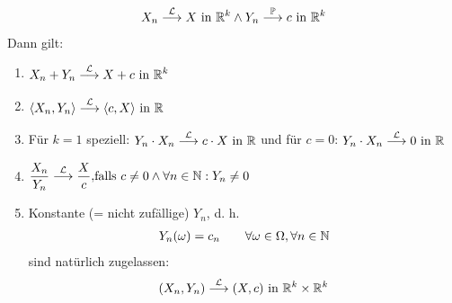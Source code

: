\begin{beispiel}\label{beisp4.18}
	\begin{align*}
		X_n\stackrel{\mathcal{L}}{\longrightarrow} X\text{ in }\mathbb{R}^k\wedge Y_n\stackrel{\mathbb{P}}{\longrightarrow} c\text{ in }\mathbb{R}^k
	\end{align*}
	Dann gilt:
	\begin{enumerate}[label=(\arabic*)]
		\item $\begin{aligned}
			X_n+Y_n\stackrel{\mathcal{L}}{\longrightarrow} X+c\text{ in }\mathbb{R}^k
		\end{aligned}$
		\item $\begin{aligned}
			\langle X_n,Y_n\rangle\stackrel{\mathcal{L}}{\longrightarrow}\langle c,X\rangle\text{ in }\mathbb{R}
		\end{aligned}$
		\item Für $k=1$ speziell:
		$\begin{aligned}
			Y_n\cdot X_n\stackrel{\mathcal{L}}{\longrightarrow}c\cdot X\text{ in }\mathbb{R}
		\end{aligned}$ und für $c=0$:
		$\begin{aligned}
			Y_n\cdot X_n\stackrel{\mathcal{L}}{\longrightarrow}0\text{ in }\mathbb{R}
		\end{aligned}$
		\item $\begin{aligned}
			\frac{X_n}{Y_n}\stackrel{\mathcal{L}}{\longrightarrow} \frac{X}{c},&\text{falls } c\neq0\wedge\forall n\in\mathbb{N}:Y_n\neq0
		\end{aligned}$
		\item Konstante (= nicht zufällige) $Y_n$, d. h.
		\begin{align*}
			Y_n(\omega)=c_n\qquad\forall\omega\in\Omega,\forall n\in\mathbb{N}
		\end{align*}
		sind natürlich zugelassen:
		\begin{align*}
			(X_n,Y_n)\stackrel{\mathcal{L}}{\longrightarrow}(X,c)\text{ in }\mathbb{R}^k\times\mathbb{R}^k
		\end{align*}
	\end{enumerate}
\end{beispiel}

